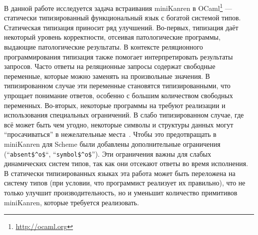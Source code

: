 В данной работе исследуется задача встраивания miniKanren в OCaml\footnote{\url{http://ocaml.org}} --- статически типизированный функциональный язык с богатой системой типов.
Статическая типизация приносит ряд улучшений.
Во-первых, типизация даёт некоторый уровень корректности, отсеивая патологические программы, выдающие патологические результаты.
В контексте реляционного программирования типизация также помогает интерпретировать результаты запросов.
Часто ответы на реляционные запросы содержат свободные переменные, которые можно заменять на произвольные значения.
В типизированном случае эти переменные становятся типизированными, что упрощает понимание ответов, особенно с большим количеством свободных переменных.
Во-вторых, некоторые программы на \miniKanren{} требуют реализации и использования специальных ограничений.
В слабо типизированном случае, где всё может быть чем угодно, некоторые символы и структуры данных могут \enquote{просачиваться} в нежелательные места~\cite{Untagged}.
Чтобы это предотвращать в miniKanren для Scheme были добавлены дополнительные ограничения (``\lstinline|absent$^o$|``, ``\lstinline|symbol$^o$|'').
Эти ограничения важны для слабых динамических систем типов, так как они отсекают ответы во время исполнения.
В статически типизированных языках эта работа может быть переложена на систему типов (при условии, что программист реализует их правильно), что не только улучшит производительность, но и уменьшит количество примитивов miniKanren, которые требуется реализовать.



